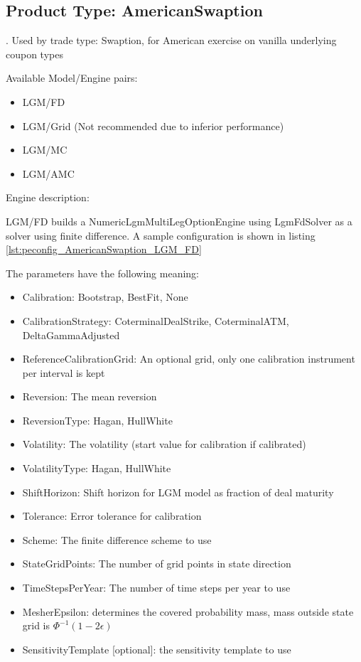 \subsection{Product Type: AmericanSwaption}

\label{sec:AmericanSwaption_pt}.
Used by trade type: Swaption, for American exercise on vanilla underlying coupon types

Available Model/Engine pairs:

\begin{itemize}
\item LGM/FD
\item LGM/Grid (Not recommended due to inferior performance)
\item LGM/MC
\item LGM/AMC
\end{itemize}

Engine description:

LGM/FD builds a NumericLgmMultiLegOptionEngine using LgmFdSolver as a solver using finite difference. A sample
configuration is shown in listing \ref{lst:peconfig_AmericanSwaption_LGM_FD}

The parameters have the following meaning:

\begin{itemize}
\item Calibration: Bootstrap, BestFit, None
\item CalibrationStrategy: CoterminalDealStrike, CoterminalATM, DeltaGammaAdjusted
\item ReferenceCalibrationGrid: An optional grid, only one calibration instrument per interval is kept
\item Reversion: The mean reversion
\item ReversionType: Hagan, HullWhite
\item Volatility: The volatility (start value for calibration if calibrated)
\item VolatilityType: Hagan, HullWhite
\item ShiftHorizon: Shift horizon for LGM model as fraction of deal maturity
\item Tolerance: Error tolerance for calibration
\item Scheme: The finite difference scheme to use
\item StateGridPoints: The number of grid points in state direction
\item TimeStepsPerYear: The number of time steps per year to use
\item MesherEpsilon: determines the covered probability mass, mass outside state grid is $\Phi^{-1}(1-2\epsilon)$
\item SensitivityTemplate [optional]: the sensitivity template to use 
\end{itemize}

